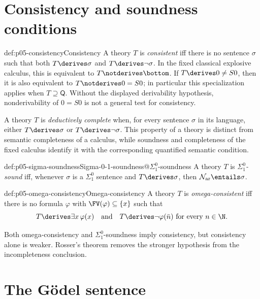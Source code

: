 \section{Consistency and soundness conditions}
\label{sec:p05-diagonalization-02}

\begin{hbdefinition}{def:p05-consistency}{Consistency}
A theory \(T\) is \emph{consistent} iff there is no sentence \(\sigma\)
such that both \(T\derives\sigma\) and \(T\derives\neg\sigma\).  In the
fixed classical explosive calculus, this is equivalent to
\(T\notderives\bottom\).  If \(T\derives 0\ne S0\), then it is also
equivalent to \(T\notderives 0=S0\); in particular this specialization
applies when \(T\supseteq\mathsf Q\).  Without the displayed
derivability hypothesis, nonderivability of \(0=S0\) is not a general
test for consistency.
\end{hbdefinition}

A theory \(T\) is \emph{deductively complete} when, for every sentence
\(\sigma\) in its language, either \(T\derives\sigma\) or
\(T\derives\neg\sigma\).  This property of a theory is distinct from
semantic completeness of a calculus, while soundness and completeness of
the fixed calculus identify it with the corresponding quantified semantic
condition.

\begin{hbdefinition}{def:p05-sigma-soundness}{Sigma-0-1-soundness@\(\Sigma^0_1\)-soundness}
A theory \(T\) is \emph{\(\Sigma^0_1\)-sound} iff, whenever \(\sigma\) is
a \(\Sigma^0_1\) sentence and \(T\derives\sigma\), then
\(\mathcal N_{\mathrm{ar}}\entails\sigma\).
\end{hbdefinition}

\begin{hbdefinition}{def:p05-omega-consistency}{Omega-consistency}
A theory \(T\) is \emph{omega-consistent} iff there is no formula
\(\varphi\) with \(\FV(\varphi)\subseteq\{x\}\) such that
\[
  T\derives\exists x\,\varphi(x)
  \quad\text{and}\quad
  T\derives\neg\varphi(\bar n)
  \text{ for every }n\in\N.
\]
\end{hbdefinition}

Both omega-consistency and \(\Sigma^0_1\)-soundness imply consistency,
but consistency alone is weaker.  Rosser's theorem removes the stronger
hypothesis from the incompleteness conclusion.

\section{The G\"odel sentence}
\label{sec:p05-diagonalization-03}

